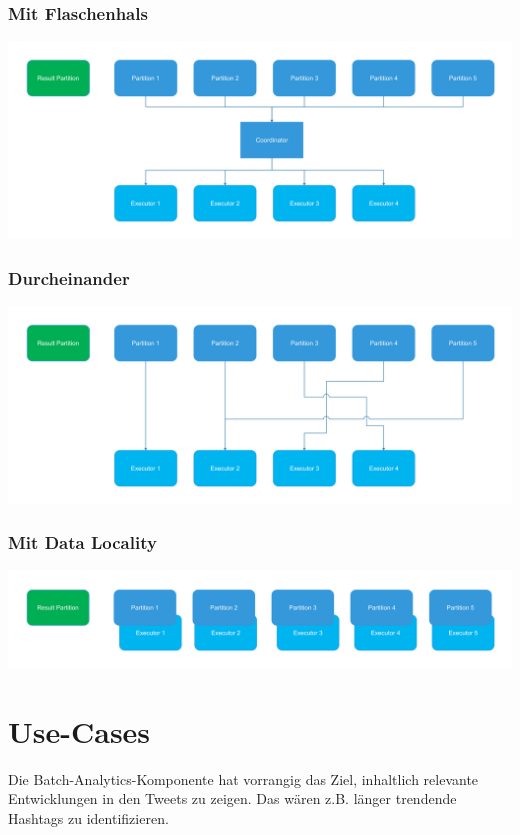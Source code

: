 \subsubsection{Mit
Flaschenhals}

\includegraphics[width=\textwidth]{bilder/eigene20PrC3A4sentation-img1.png}


\subsubsection{Durcheinander}

\includegraphics[width=\textwidth]{bilder/eigene20PrC3A4sentation-img2.png}


\subsubsection{Mit Data
Locality}

\includegraphics[width=\textwidth]{bilder/eigene20PrC3A4sentation-img3.png}


\section{Use-Cases}
Die Batch-Analytics-Komponente hat vorrangig das Ziel, inhaltlich
relevante Entwicklungen in den Tweets zu zeigen. Das wären z.B. länger
trendende Hashtags zu identifizieren.

